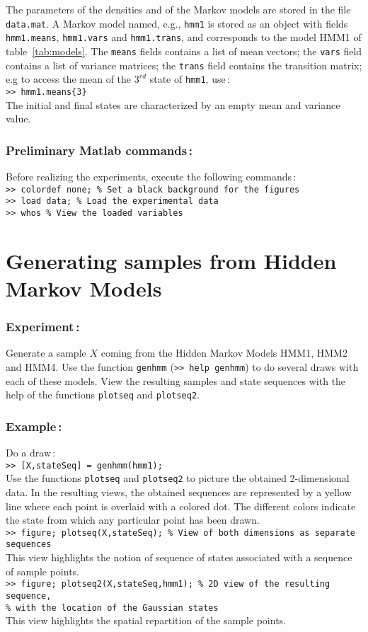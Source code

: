 \documentclass[twoside,a4paper,titlepage]{article}
\newcommand{\mat}[1]{{\tt >> #1} \\}
\newcommand{\com}[1]{{\tt #1}}
\begin{document}
The parameters of the densities and of the Markov models are stored in the
file \com{data.mat}. A Markov model named, e.g., \com{hmm1} is stored as an
object with fields \com{hmm1.means}, \com{hmm1.vars} and \com{hmm1.trans},
and corresponds to the model HMM1 of table~\ref{tab:models}. The
\com{means} fields contains a list of mean vectors; the \com{vars} field
contains a list of variance matrices; the \com{trans} field contains the
transition matrix; e.g to access the mean of the $3^{rd}$ state of
\com{hmm1}, use\,: \\
%
\mat{hmm1.means\{3\}}
%
The initial and final states are characterized by an empty mean and variance
value.


\subsubsection*{Preliminary Matlab commands\,:}
Before realizing the experiments, execute the following commands\,: \\
\mat{colordef none; \% Set a black background for the figures}
\mat{load data; \% Load the experimental data}
\mat{whos \% View the loaded variables}


\pagebreak
\section{Generating samples from Hidden Markov Models}
\label{sec:generating}

\subsubsection*{Experiment\,:}
Generate a sample $X$ coming from the Hidden Markov Models HMM1, HMM2 and
HMM4.  Use the function \com{genhmm} (\com{>> help genhmm}) to do several
draws with each of these models. View the resulting samples and state
sequences with the help of the functions \com{plotseq} and \com{plotseq2}.

\subsubsection*{Example\,:}
Do a draw\,: \\
\mat{[X,stateSeq] = genhmm(hmm1);}

\noindent Use the functions \com{plotseq} and \com{plotseq2} to picture the
obtained 2-dimensional data. In the resulting views, the obtained sequences
are represented by a yellow line where each point is overlaid with a
colored dot.  The different colors indicate the state from which any
particular point has been drawn. \\
\mat{figure; plotseq(X,stateSeq); \% View of both dimensions as separate sequences}
This view highlights the notion of sequence of states associated with a
sequence of sample points. \\
\mat{figure; plotseq2(X,stateSeq,hmm1); \% 2D view of the resulting sequence,}
\mbox{\hspace{46ex}} \com{\% with the location of the Gaussian states} \\
This view highlights the spatial repartition of the sample points.
\end{document}
